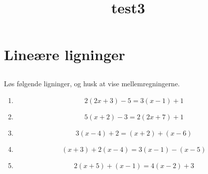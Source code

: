 \documentclass[10pt,a4paper,table]{article}
\title{\vestb test3}
\author{}
\date{}
\begin{document}
\thispagestyle{plain}

\section{Line\ae re ligninger}
\subsection{}
L\o s f\o lgende ligninger, og husk at vise mellemregningerne.
\begin{enumerate}
  \item
    \[
      2(2x + 3) - 5 = 3(x - 1) + 1
    \]
  \item
    \[
      5(x + 2) - 3 = 2(2x + 7) + 1
    \]
  \item
    \[
      3(x - 4) + 2 = (x + 2) + (x - 6)
    \]
  \item
    \[
      (x + 3) + 2(x - 4) = 3(x - 1) - (x - 5)
    \]
  \item
    \[
      2(x + 5) + (x - 1) = 4(x - 2) + 3
    \]
\end{enumerate}
\end{document}
